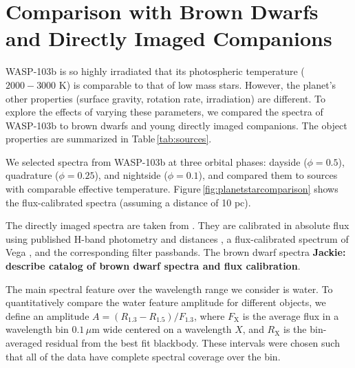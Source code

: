 \documentclass[twocolumn]{aastex61}
\begin{document}
\section{Comparison with Brown Dwarfs and Directly Imaged Companions}
\label{sec:comparison}
WASP-103b is so highly irradiated that its photospheric temperature ($2000 - 3000$ K) is comparable to that of low mass stars. However, the planet's other properties (surface gravity, rotation rate, irradiation) are different. To explore the effects of varying these parameters, we compared the spectra of WASP-103b to brown dwarfs and young directly imaged companions. The object properties are summarized in Table\,\ref{tab:sources}.

We selected spectra from WASP-103b at three orbital phases: dayside ($\phi = 0.5$), quadrature ($\phi = 0.25$), and nightside ($\phi = 0.1$), and compared them to sources with comparable effective temperature. Figure\,\ref{fig:planetstarcomparison} shows the flux-calibrated spectra (assuming a distance of 10 pc).

The directly imaged spectra are taken from \cite{wahhaj11, aller13, bonnefoy14}. They are calibrated in absolute flux using published H-band photometry \citep{wahhaj11, bonnefoy09, aller13} and distances \citep{gaia16}, a flux-calibrated spectrum of Vega \citep{1985A&A...151..399M, 1985IAUS..111..225H}, and the corresponding filter passbands.  The brown dwarf spectra \textbf{Jackie: describe catalog of brown dwarf spectra and flux calibration}.

The main spectral feature over the wavelength range we consider is water. To quantitatively compare the water feature amplitude for different objects, we define an amplitude $A = (R_\mathrm{1.3} - R_\mathrm{1.5})/F_\mathrm{1.3}$, where $F_\mathrm{X}$ is the average flux in a wavelength bin $0.1\,\mu$m wide centered on a wavelength $X$, and $R_\mathrm{X}$ is the bin-averaged residual from the best fit blackbody. These intervals were chosen such that all of the data have complete spectral coverage over the bin. 
\end{document}
